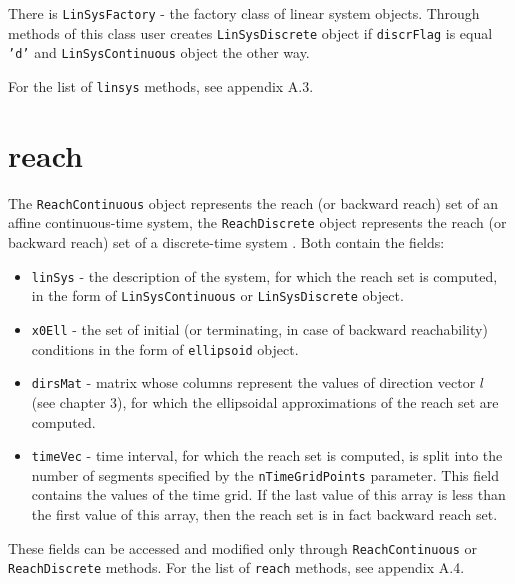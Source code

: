 There is {\tt LinSysFactory} - the factory class of linear system objects. Through methods of this class
user creates {\tt LinSysDiscrete} object if {\tt discrFlag} is equal {\tt 'd'} and {\tt LinSysContinuous} object
the other way.

For the list of {\tt linsys} methods, see appendix A.3.



\section{reach}
The {\tt ReachContinuous} object represents the reach (or backward reach)
set of an affine continuous-time system, the {\tt ReachDiscrete} object represents
the reach (or backward reach) set of a discrete-time system . Both contain the fields:
\begin{itemize}
\item {\tt linSys} - the description of the system, for which the reach set
is computed, in the form of {\tt LinSysContinuous} or {\tt LinSysDiscrete} object.

\item {\tt x0Ell} - the set of initial (or terminating, in case of backward
reachability) conditions in the form of {\tt ellipsoid}
object.
\item {\tt dirsMat} - matrix whose columns represent the values
of direction vector $l$ (see chapter 3), for which the ellipsoidal
approximations of the reach set are computed.
\item {\tt timeVec} - time interval, for which the reach set is computed,
is split into the number of segments specified by the 
{\tt nTimeGridPoints} parameter. This field contains the values
of the time grid. If the last value of this array is less than the first 
value of this array, then the reach set is in fact backward reach set.
\end{itemize}
These fields can be accessed and modified only through {\tt ReachContinuous} or
{\tt ReachDiscrete} methods.
For the list of {\tt reach} methods, see appendix A.4.
